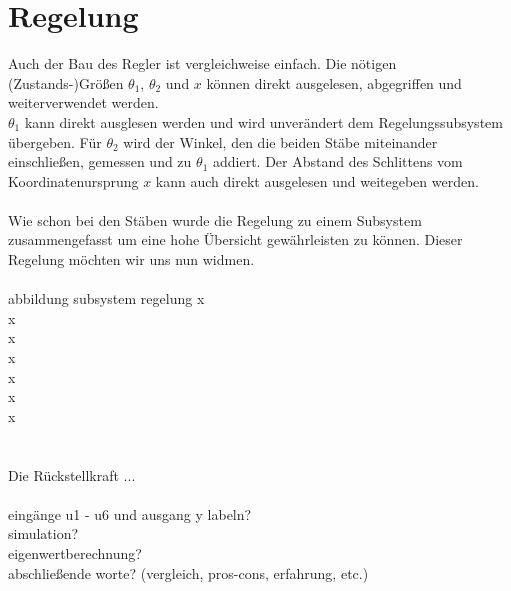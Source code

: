 \documentclass[a4paper, 10pt]{report}
\begin{document}
\section{Regelung}
Auch der Bau des Regler ist vergleichweise einfach. Die nötigen (Zustands-)Größen $\theta_{1}$, $\theta_{2}$ und $x$ können direkt ausgelesen, abgegriffen und weiterverwendet werden. \\
$\theta_{1}$ kann direkt ausglesen werden und wird unverändert dem Regelungssubsystem übergeben. Für $\theta_{2}$ wird der Winkel, den die beiden Stäbe miteinander einschließen, gemessen und zu $\theta_{1}$ addiert. Der Abstand des Schlittens vom Koordinatenursprung $x$ kann auch direkt ausgelesen und weitegeben werden. 
\\ \\
Wie schon bei den Stäben wurde die Regelung zu einem Subsystem zusammengefasst um eine hohe Übersicht gewährleisten zu können. Dieser Regelung möchten wir uns nun widmen.
\\ \\
abbildung subsystem regelung
x\\x\\x\\x\\x\\x\\x\\
\\ \\
Die Rückstellkraft ...
\\ \\
eingänge u1 - u6 und ausgang y labeln? \\
simulation? \\
eigenwertberechnung? \\

abschließende worte? (vergleich, pros-cons, erfahrung, etc.)
\end{document}
